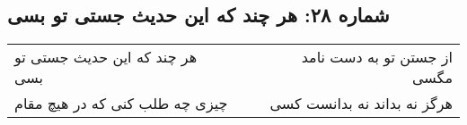 \begin{center}
\section*{شماره ۲۸: هر چند که این حدیث جستی تو بسی}
\label{sec:028}
\begin{longtable}{l p{0.5cm} r}
هر چند که این حدیث جستی تو بسی
&&
از جستن تو به دست نامد مگسی
\\
چیزی چه طلب کنی که در هیچ مقام
&&
هرگز نه بداند نه بدانست کسی
\\
\end{longtable}
\end{center}
